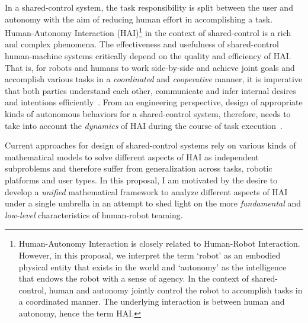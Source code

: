 \documentclass[12pt]{article}
\begin{document}
In a shared-control system, the task responsibility is split between the user and autonomy  with the aim of reducing human effort in accomplishing a task. Human-Autonomy Interaction (HAI)\footnote{Human-Autonomy Interaction is closely related to Human-Robot Interaction. However, in this proposal, we interpret the term `robot' as an embodied physical entity that exists in the world and `autonomy' as the intelligence that endows the robot with a sense of agency. In the context of shared-control, human and autonomy jointly control the robot to accomplish tasks in a coordinated manner. The underlying interaction is between human and autonomy, hence the term HAI.} in the context of shared-control is a rich and complex phenomena. The effectiveness and usefulness of shared-control human-machine systems critically depend on the quality and efficiency of HAI. That is, for robots and humans to work side-by-side and achieve joint goals and accomplish various tasks in a \textit{coordinated} and \textit{cooperative} manner, it is imperative that both parties understand each other, communicate and infer internal desires and intentions efficiently~\cite{hoc2001towards}. From an engineering perspective, design of appropriate kinds of autonomous behaviors for a shared-control system, therefore, needs to take into account the \textit{dynamics} of HAI during the course of task execution~\cite{hoffman2007cost}. 

Current approaches for design of shared-control systems rely on various kinds of mathematical models to solve different aspects of HAI as independent subproblems and therefore suffer from generalization across tasks, robotic platforms and user types. In this proposal, I am motivated by the desire to develop a \textit{unified} mathematical framework to analyze different aspects of HAI under a single umbrella in an attempt to shed light on the more \textit{fundamental} and \textit{low-level} characteristics of human-robot teaming.
\end{document}
